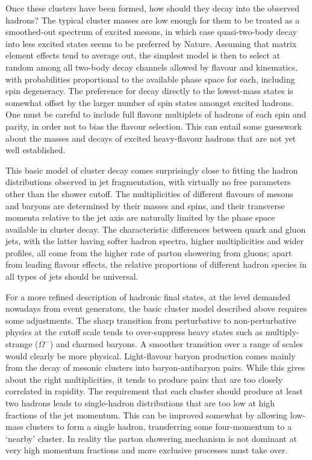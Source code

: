 Once these clusters have been formed, how should they decay into the
observed hadrons?  The typical cluster masses are low enough for them
to be treated as a smoothed-out spectrum of excited mesons, in which
case quasi-two-body decay into less excited states seems to be
preferred by Nature.   Assuming that matrix element effects tend to average out,
the simplest model is then to select at random among all two-body decay
channels allowed by flavour and kinematics, with probabilities
proportional to the available phase space for each, including spin
degeneracy.  The preference for decay directly to the lowest-mass
states is somewhat offset by the larger number of spin states amongst
excited hadrons.  One must be careful to include full flavour
multiplets of hadrons of each spin and parity, in order not to bias
the flavour selection. This can entail some guesswork about the masses
and decays of excited heavy-flavour hadrons that are not yet well established.

This basic model of cluster decay comes surprisingly
close to fitting the hadron distributions observed in jet
fragmentation, with virtually no free parameters other than the shower
cutoff.  The multiplicities of different flavours of mesons and
baryons are determined by their masses and spins, and their
transverse momenta relative to the jet axis are naturally limited by
the phase space available in cluster decay. The characteristic
differences between quark and gluon jets, with the latter having
softer hadron spectra, higher multiplicities and wider profiles, all come
from the higher rate of parton showering from gluons; apart from
leading flavour effects, the relative proportions of different hadron species
in all types of jets should be universal.

For a more refined description of hadronic final states, at the level
demanded nowadays from event generators, the basic cluster model
described above requires some adjustments.  The sharp
transition from perturbative to non-perturbative physics at the
cutoff scale tends to over-suppress heavy states such as
multiply-strange (\eg $\Omega^-$) and charmed baryons.  A smoother
transition over a range of scales would clearly be more physical.
Light-flavour baryon production
comes mainly from the decay of mesonic clusters into baryon-antibaryon
pairs.   While this gives about the right multiplicities, it tends to
produce pairs that are too closely correlated in rapidity.  The
requirement that each cluster should produce at least two hadrons leads
to single-hadron distributions that are too low at high fractions of the
jet momentum.  This can be improved somewhat by allowing low-mass
clusters to form a single hadron, transferring some four-momentum
to a `nearby' cluster.  In reality the parton showering mechanism
is not dominant at very high momentum fractions and more exclusive
processes must take over.

